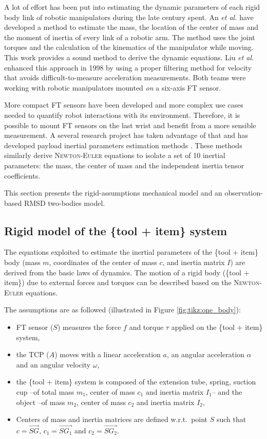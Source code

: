 \documentclass[/home/francois/latex/report/main.tex]{subfiles}
\begin{document}
A lot of effort has been put into estimating the dynamic parameters of each rigid body link of robotic manipulators during the late century spent. An \textit{et al.} \cite{An1985} have developed a method to estimate the mass, the location of the center of mass and the moment of inertia of every link of a robotic arm. The method uses the joint torques and the calculation of the kinematics of the manipulator while moving. This work provides a sound method to derive the dynamic equations. Liu \textit{et al.} enhanced this approach in 1998 \cite{Liu1998} by using a proper filtering method for velocity that avoids difficult-to-measure acceleration measurements. Both teams were working with robotic manipulators mounted \textit{on} a six-axis \ac{FT} sensor.

More compact \ac{FT} sensors have been developed and more complex use cases needed to quantify robot interactions with its environment. Therefore, it is possible to mount \ac{FT} sensors on the last wrist and benefit from a more sensible measurement. A several research project has taken advantage of that and has developed payload inertial parameters estimation methods \cite{Kubus2008, Kubus2007, Kubus2014, Farsoni2018}. These methods similarly derive \textsc{Newton-Euler} equations to isolate a set of 10 inertial parameters: the mass, the center of mass and the independent inertia tensor coefficients.

This section presents the rigid-assumptions mechanical model and an observation-based \ac{RMSD} two-bodies model.

\subsection{Rigid model of the \{tool + item\} system}

The equations exploited to estimate the inertial parameters of the \{tool + item\} body (mass $m$, coordinates of the center of mass $c$, and inertia matrix $I$) are derived from the basic laws of dynamics. The motion of a rigid body (\{tool + item\}) due to external forces and torques can be described based on the \textsc{Newton-Euler} equations.

The assumptions are as followed (illustrated in Figure \ref{fig:tikz:one_body}):

\begin{itemize}
 \item \ac{FT} sensor ($S$) measures the force $f$ and torque $\tau$ applied on the \{tool + item\} system,
 \item the \ac{TCP} ($A$) moves with a linear acceleration $a$, an angular acceleration $\alpha$ and an angular velocity $\omega$,
 \item the \{tool + item\} system is composed of the extension tube, spring, suction cup –of total mass $m_1$, center of mass $c_1$ and inertia matrix $I_1$– and the object –of mass $m_2$, center of mass $c_2$ and inertia matrix $I_2$,
 \item Centers of mass and inertia matrices are defined w.r.t.\ point $S$ such that $c = \overrightarrow{SG}$, $c_1 = \overrightarrow{SG_1}$ and $c_2 = \overrightarrow{SG_2}$.
\end{itemize}
\end{document}

